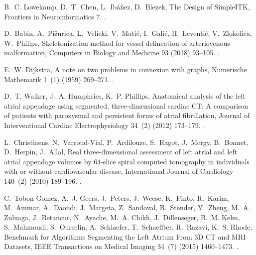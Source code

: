 \documentclass[review]{elsarticle}
\begin{document}
\begin{thebibliography}{10}
B.~C. Lowekamp, D.~T. Chen, L.~Ib\'a\~nez, D.~Blezek, The {{Design}} of
  {{SimpleITK}}, Frontiers in Neuroinformatics 7.
\newblock \href {http://dx.doi.org/10.3389/fninf.2013.00045}
  {}.

D.~Babin, A.~Pi{\v z}urica, L.~Velicki, V.~Mati\'c, I.~Gali\'c, H.~Leventi\'c,
  V.~Zlokolica, W.~Philips, Skeletonization method for vessel delineation of
  arteriovenous malformation, Computers in Biology and Medicine 93 (2018)
  93--105.
\newblock \href {http://dx.doi.org/10.1016/j.compbiomed.2017.12.011}
  {}.

E.~W. Dijkstra, A note on two problems in connexion with graphs, Numerische
  Mathematik 1~(1) (1959) 269--271.
\newblock \href {http://dx.doi.org/10.1007/BF01386390}
  {}.

D.~T. Walker, J.~A. Humphries, K.~P. Phillips, Anatomical analysis of the left
  atrial appendage using segmented, three-dimensional cardiac {{CT}}: A
  comparison of patients with paroxysmal and persistent forms of atrial
  fibrillation, Journal of Interventional Cardiac Electrophysiology 34~(2)
  (2012) 173--179.
\newblock \href {http://dx.doi.org/10.1007/s10840-011-9638-1}
  {}.

L.~Christiaens, N.~{Varroud-Vial}, P.~Ardilouze, S.~Ragot, J.~Mergy, B.~Bonnet,
  D.~Herpin, J.~Allal, Real three-dimensional assessment of left atrial and
  left atrial appendage volumes by 64-slice spiral computed tomography in
  individuals with or without cardiovascular disease, International Journal of
  Cardiology 140~(2) (2010) 189--196.
\newblock \href {http://dx.doi.org/10.1016/j.ijcard.2008.11.055}
  {}.

C.~{Tobon-Gomez}, A.~J. Geers, J.~Peters, J.~Weese, K.~Pinto, R.~Karim,
  M.~Ammar, A.~Daoudi, J.~Margeta, Z.~Sandoval, B.~Stender, Y.~Zheng, M.~A.
  Zuluaga, J.~Betancur, N.~Ayache, M.~A. Chikh, J.~Dillenseger, B.~M. Kelm,
  S.~Mahmoudi, S.~Ourselin, A.~Schlaefer, T.~Schaeffter, R.~Razavi, K.~S.
  Rhode, Benchmark for {{Algorithms Segmenting}} the {{Left Atrium From 3D CT}}
  and {{MRI Datasets}}, IEEE Transactions on Medical Imaging 34~(7) (2015)
  1460--1473.
\newblock \href {http://dx.doi.org/10.1109/TMI.2015.2398818}
  {}.

\end{thebibliography}
\end{document}

